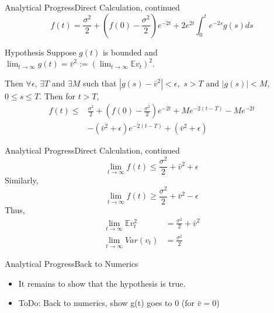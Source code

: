 \documentclass{beamer}
\begin{document}
\begin{frame}{Analytical Progress}{Direct Calculation, continued}
	\begin{equation}
	f(t)=\frac{\sigma^2}{2}+\left(f(0)-\frac{\sigma^2}{2}\right)e^{-2t}+2e^{2t}\int_0^te^{-2s}g(s)ds
	\end{equation}
	\begin{block}{Hypothesis}
	Suppose $g(t)$ is bounded and $\lim_{t \rightarrow \infty}g(t) =\bar{v}^2:=(\lim_{t \rightarrow \infty} \mathbb{E}v_t)^2$.
	\end{block}
	Then $\forall \epsilon$, $\exists T$ and $\exists M$ such that $|g(s)-\bar{v}^2|<\epsilon,$ $s>T$ and $|g(s)|<M,$ $0 \leq s \leq T$.
	Then for $t>T$,
		\begin{equation}
		\begin{split}
		f(t)\leq& \frac{\sigma^2}{2}+\left(f(0)-\frac{\sigma^2}{2}\right)e^{-2t}+M e^{-2(t-T)}-M e^{-2t} \\
		&-(\bar{v}^2+\epsilon) e^{-2(t-T)}+(\bar{v}^2+\epsilon)
		\end{split}
		\end{equation}
\end{frame}

\begin{frame}{Analytical Progress}{Direct Calculation, continued}
	\begin{equation}
	\lim_{t \rightarrow \infty}f(t)\leq \frac{\sigma^2}{2}+\bar{v}^2+\epsilon
	\end{equation}
	Similarly,
	\begin{equation}
	\lim_{t \rightarrow \infty}f(t)\geq \frac{\sigma^2}{2}+\bar{v}^2-\epsilon
	\end{equation}
	Thus,
	\begin{equation}
	\begin{split}
	\lim_{t \rightarrow \infty} \mathbb{E}v_t^2&=\frac{\sigma^2}{2}+\bar{v}^2 \\
	\lim_{t \rightarrow \infty} Var(v_t)&=\frac{\sigma^2}{2}
	\end{split}
	\end{equation}
\end{frame}

\begin{frame}{Analytical Progress}{Back to Numerics}
	\begin{itemize}
		\item It remains to show that the hypothesis is true.
		\item ToDo: Back to numerics, show g(t) goes to 0 (for $\bar{v}=0$)
	\end{itemize}
	
\end{frame}
\end{document}
